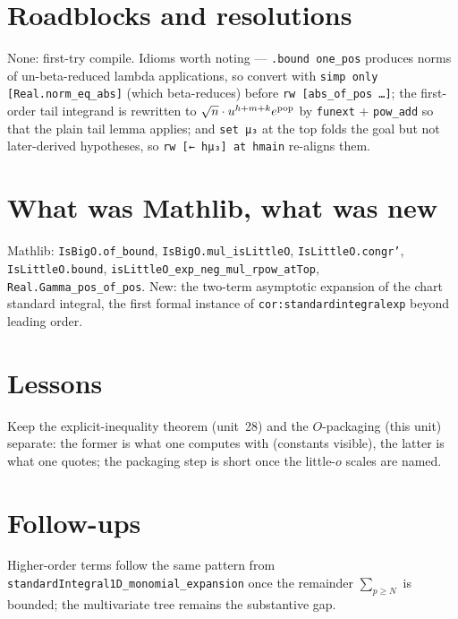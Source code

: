 \documentclass[11pt]{article}
\begin{document}
\section{Roadblocks and resolutions}
None: first-try compile. Idioms worth noting --- \texttt{.bound one\_pos} produces norms of
un-beta-reduced lambda applications, so convert with \texttt{simp only [Real.norm\_eq\_abs]} (which
beta-reduces) before \texttt{rw [abs\_of\_pos \dots]}; the first-order tail integrand is rewritten to
$\sqrt n\cdot u^{h+m+k}e^{\rm pop}$ by \texttt{funext} + \texttt{pow\_add} so that the plain tail lemma
applies; and \texttt{set μ₃} at the top folds the goal but not later-derived hypotheses, so
\texttt{rw [← hμ₃] at hmain} re-aligns them.

\section{What was Mathlib, what was new}
Mathlib: \texttt{IsBigO.of\_bound}, \texttt{IsBigO.mul\_isLittleO}, \texttt{IsLittleO.congr'},
\texttt{IsLittleO.bound}, \texttt{isLittleO\_exp\_neg\_mul\_rpow\_atTop}, \texttt{Real.Gamma\_pos\_of\_pos}.
New: the two-term asymptotic expansion of the chart standard integral, the first formal instance of
\texttt{cor:standardintegralexp} beyond leading order.

\section{Lessons}
Keep the explicit-inequality theorem (unit~28) and the $O$-packaging (this unit) separate: the former
is what one computes with (constants visible), the latter is what one quotes; the packaging step is
short once the little-$o$ scales are named.

\section{Follow-ups}
Higher-order terms follow the same pattern from \texttt{standardIntegral1D\_monomial\_expansion} once the
remainder $\sum_{p\ge N}$ is bounded; the multivariate tree remains the substantive gap.
\end{document}
